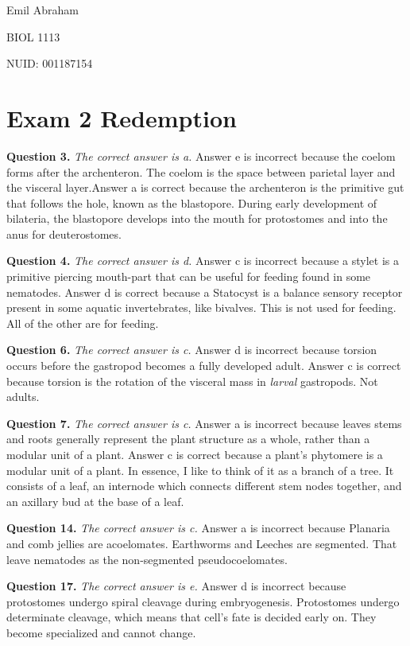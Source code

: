 \documentclass{article}
\begin{document}
{\parskip=0pt
\noindent Emil Abraham\par
\noindent BIOL 1113\par
\noindent NUID: 001187154}

\section*{Exam 2 Redemption}

\textbf{Question 3.} \textit{The correct answer is a.} Answer e is incorrect
because the coelom forms after the archenteron. The coelom is the space between
parietal layer and the visceral layer.Answer a is correct because the
archenteron is the primitive gut that follows the hole, known as the blastopore.
During early development of bilateria, the blastopore develops into the mouth
for protostomes and into the anus for deuterostomes.

\textbf{Question 4.} \textit{The correct answer is d.} Answer c is incorrect
because a stylet is a primitive piercing mouth-part that can be useful for
feeding found in some nematodes.  Answer d is correct because a Statocyst is a
balance sensory receptor present in some aquatic invertebrates, like bivalves.
This is not used for feeding. All of the other are for feeding. 

\textbf{Question 6.} \textit{The correct answer is c.} Answer d is incorrect
because torsion occurs before the gastropod becomes a fully developed adult.
Answer c is correct because torsion is the rotation of the visceral mass in
\textit{larval} gastropods. Not adults.

\textbf{Question 7.} \textit{The correct answer is c.} Answer a is incorrect
because leaves stems and roots generally represent the plant structure as a
whole, rather than a modular unit of a plant. Answer c is correct because a
plant's phytomere is a modular unit of a plant. In essence, I like to think of
it as a branch of a tree. It consists of a leaf, an internode which connects
different stem nodes together, and an axillary bud at the base of a leaf.

\textbf{Question 14.} \textit{The correct answer is c.} Answer a is incorrect
because Planaria and comb jellies are acoelomates. Earthworms and Leeches are
segmented. That leave nematodes as the non-segmented pseudocoelomates.

\textbf{Question 17.} \textit{The correct answer is e.} Answer d is incorrect
because protostomes undergo spiral cleavage during embryogenesis. Protostomes
undergo determinate cleavage, which means that cell's fate is decided early on.
They become specialized and cannot change.
\end{document}
